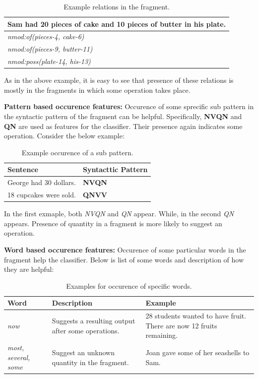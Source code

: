 \documentclass[11pt]{article}
\begin{document}
\newpage
\begin{table}[h!]
\centering
\begin{tabular}{ | m{25em} | }
\hline
 \textbf{Sam had 20 pieces of cake and 10 pieces of butter in his plate.}\\
\hline
\textit{nmod:of(pieces-4, cake-6)}\\
\hline
\textit{nmod:of(pieces-9, butter-11)}\\
\hline
\textit{nmod:poss(plate-14, his-13)}\\
\hline
\end{tabular}
\caption{Example relations in the fragment.}
\label{table:16}
\end{table}

As in the above example, it is easy to see that presence of these relations is mostly in the fragments in which some operation takes place.

\textbf{Pattern based occurence features:} Occurence of some sprecific sub pattern in the syntactic pattern of the fragment can be helpful. Specifically, \textbf{NVQN} and \textbf{QN} are used as features for the classifier. Their presence again indicates some operation. Consider the below example:

\begin{table}[h!]
\centering
\begin{tabular}{ | m{20em} | m{5em} |}
\hline
 \textbf{Sentence} & \textbf{Syntacttic Pattern}\\
\hline
George had 30 dollars. & \textbf{NVQN} \\
\hline
18 cupcakes were sold. & \textbf{QNVV} \\
\hline
\end{tabular}
\caption{Example occurence of a sub pattern.}
\label{table:17}
\end{table}

In the first exmaple, both \textit{NVQN} and \textit{QN} appear. While, in the second \textit{QN} appears. Presence of quantity in a fragment is more likely to suggest an operation. 

\textbf{Word based occurence features:} Occurence of some particular words in the fragment help the classifier. Below is list of some words and description of how they are helpful:

\begin{table}[h!]
\centering
\begin{tabular}{ | m{5em} | m{15em} | m{15em} | }
\hline
 \textbf{Word} & \textbf{Description} & \textbf{Example}\\
\hline
\textit{now} & Suggests a resulting output after some operations. & 28 students wanted to have fruit. There are now 12 fruits remaining. \\
\hline
\textit{most, several, some} & Suggest an unknown quantity in the fragment. & Joan gave some of her seashells to Sam. \\
\hline
\end{tabular}
\caption{Examples for occurence of specific words.}
\label{table:17}
\end{table}
\end{document}
